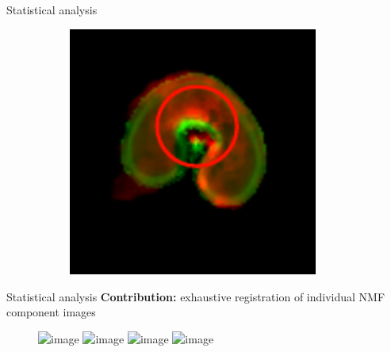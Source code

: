 \documentclass[10pt]{beamer}
\begin{document}
\begin{frame}{Statistical analysis}
\begin{figure}[ht]
\begin{subfigure}[t]{0.33\textwidth}
    \caption{}
    \label{subfig:msi_6_original}
  \end{subfigure}%
  \begin{subfigure}[t]{0.33\textwidth}
    \centering
    \includegraphics[width=0.9\textwidth]{fig/overlay_t2_6_original}
    \caption{}
    \label{subfig:overlay_t2_6_original}
  \end{subfigure}%
\end{figure}

\end{frame}


\begin{frame}{Statistical analysis}
  \textbf{Contribution:} exhaustive registration of individual NMF component images


  \begin{figure}[ht]
    \centering
    \includegraphics<1>[width=0.9\textwidth]{fig/translation_nmf_0}%
    \includegraphics<2>[width=0.9\textwidth]{fig/translation_nmf_1}%
    \includegraphics<3>[width=0.9\textwidth]{fig/translation_nmf_2}%
    \includegraphics<4>[width=0.9\textwidth]{fig/translation_nmf_3}%
  \end{figure}

  
\end{frame}







\end{document}
